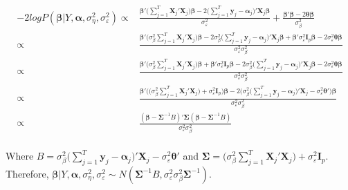 \documentclass[
]{article}
\begin{document}
\begin{equation*}
\begin{aligned}
-2logP(\boldsymbol{\beta}|Y, \boldsymbol{\alpha}, \sigma^2_\eta, \sigma^2_\varepsilon) \propto & \frac{\boldsymbol{\beta}'\big(\sum^T_{j=1}\boldsymbol{X}_j'\boldsymbol{X}_j\big)\boldsymbol{\beta} -2\big(\sum^T_{j=1}\boldsymbol{y}_j-\boldsymbol{\alpha}_j\big)'\boldsymbol{X}_j\boldsymbol{\beta} }{\sigma^2_\varepsilon} + \frac{\boldsymbol{\beta}'\boldsymbol{\beta} - 2\boldsymbol{\theta}\boldsymbol{\beta}}{\sigma^2_\beta}\\
 \propto & \frac{\boldsymbol{\beta}'\big(\sigma^2_\beta\sum^T_{j=1}\boldsymbol{X}_j'\boldsymbol{X}_j\big)\boldsymbol{\beta} -2\sigma^2_\beta\big(\sum^T_{j=1}\boldsymbol{y}_j-\boldsymbol{\alpha}_j\big)'\boldsymbol{X}_j\boldsymbol{\beta} +\boldsymbol{\beta}'\sigma^2_\varepsilon \boldsymbol{I}_p \boldsymbol{\beta} - 2\sigma^2_\varepsilon\boldsymbol{\theta}\boldsymbol{\beta}}{\sigma^2_\varepsilon\sigma^2_\beta}\\
  \propto & \frac{\boldsymbol{\beta}'\big(\sigma^2_\beta\sum^T_{j=1}\boldsymbol{X}_j'\boldsymbol{X}_j\big)\boldsymbol{\beta}+\boldsymbol{\beta}'\sigma^2_\varepsilon \boldsymbol{I}_p \boldsymbol{\beta} -2\sigma^2_\beta\big(\sum^T_{j=1}\boldsymbol{y}_j-\boldsymbol{\alpha}_j\big)'\boldsymbol{X}_j\boldsymbol{\beta}  - 2\sigma^2_\varepsilon\boldsymbol{\theta}\boldsymbol{\beta}}{\sigma^2_\varepsilon\sigma^2_\beta}\\
\propto & \frac{\boldsymbol{\beta}' \bigg(\big(\sigma^2_\beta\sum^T_{j=1}\boldsymbol{X}_j'\boldsymbol{X}_j\big)+\sigma^2_\varepsilon \boldsymbol{I}_p \bigg) \boldsymbol{\beta} -2\bigg(\sigma^2_\beta\big(\sum^T_{j=1}\boldsymbol{y}_j-\boldsymbol{\alpha}_j\big)'\boldsymbol{X}_j -\sigma^2_\varepsilon\boldsymbol{\theta}'\bigg)\boldsymbol{\beta}}{\sigma^2_\varepsilon\sigma^2_\beta}\\
\propto & \frac{(\boldsymbol{\beta} - \boldsymbol{\Sigma}^{-1} B)'
\boldsymbol{\Sigma}
(\boldsymbol{\beta} - \boldsymbol{\Sigma}^{-1}B)}{\sigma^2_\varepsilon\sigma^2_\beta}\\
\end{aligned}
\end{equation*}

Where \(B = \sigma^2_\beta\big(\sum^T_{j=1}\boldsymbol{y}_j-\boldsymbol{\alpha}_j\big)'\boldsymbol{X}_j -\sigma^2_\varepsilon\boldsymbol{\theta}'\) and \(\boldsymbol{\Sigma} = \big(\sigma^2_\beta\sum^T_{j=1}\boldsymbol{X}_j'\boldsymbol{X}_j\big)+\sigma^2_\varepsilon \boldsymbol{I}_p\). Therefore, \(\boldsymbol{\beta}|Y, \boldsymbol{\alpha}, \sigma^2_\eta, \sigma^2_\varepsilon \sim N(\boldsymbol{\Sigma}^{-1}B, \sigma^2_\varepsilon\sigma^2_\beta\boldsymbol{\Sigma}^{-1})\).
\end{document}
